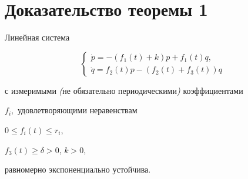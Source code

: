 \section{Доказательство теоремы 1}





\begin{lem} Линейная система


%


\begin{equation}


\begin{cases}


\Dot p=-(f_1(t)+k)p+f_1(t)q, \\


\Dot q=f_2(t)p - (f_2(t) + f_3(t))q


\end{cases}


\end{equation}


%


с измеримыми {\em (}не обязательно периодическими{\em )} коэффициентами


$f_i,$ удовлетворяющими неравенствам


$0\le f_i(t)\le r_i$,


$f_3(t)\ge \delta > 0$, $k>0$,


равномерно экспоненциально устойчива.


\end{lem}





